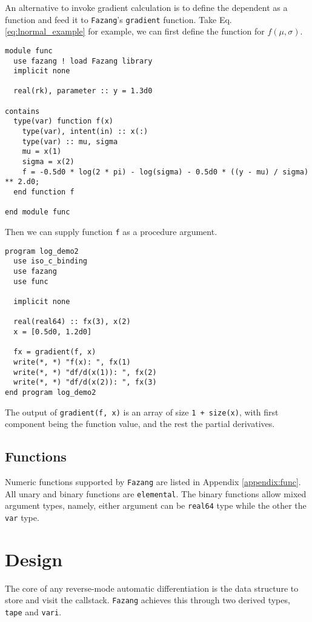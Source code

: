 \documentclass[12pt, reqno, oneside]{amsbook}
\begin{document}
An alternative to invoke gradient calculation is to define the
dependent as a function and feed it to \texttt{Fazang}'s \texttt{gradient}
function. Take Eq.\eqref{eq:lnormal_example} for example, we can first
define the function for \(f(\mu, \sigma)\).
\begin{verbatim}
module func
  use fazang ! load Fazang library
  implicit none

  real(rk), parameter :: y = 1.3d0

contains
  type(var) function f(x)
    type(var), intent(in) :: x(:)
    type(var) :: mu, sigma
    mu = x(1)
    sigma = x(2)
    f = -0.5d0 * log(2 * pi) - log(sigma) - 0.5d0 * ((y - mu) / sigma) ** 2.d0;
  end function f

end module func
\end{verbatim}
Then we can supply function \texttt{f} as a procedure argument.
\begin{verbatim}
program log_demo2
  use iso_c_binding
  use fazang
  use func

  implicit none

  real(real64) :: fx(3), x(2)
  x = [0.5d0, 1.2d0]

  fx = gradient(f, x)
  write(*, *) "f(x): ", fx(1)
  write(*, *) "df/d(x(1)): ", fx(2)
  write(*, *) "df/d(x(2)): ", fx(3)
end program log_demo2
\end{verbatim}
The output of \texttt{gradient(f, x)} is an array of size \texttt{1 + size(x)}, with
first component being the function value, and the rest the partial
derivatives.

\section{Functions}
\label{sec:orgea452dc}
Numeric functions supported by \texttt{Fazang} are listed in Appendix \ref{appendix:func}. All unary and
binary functions are \texttt{elemental}. The binary functions allow mixed
argument types, namely, either argument can be \texttt{real64} type while the
other the \texttt{var} type.

\chapter{Design}
\label{sec:orgbdbdc47}
The core of any reverse-mode automatic differentiation is the data
structure to store and visit the callstack. \texttt{Fazang} achieves this
through two derived types, \texttt{tape} and \texttt{vari}.
\end{document}

